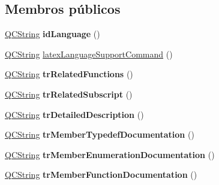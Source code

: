 \subsection*{Membros públicos}
\begin{DoxyCompactItemize}
\item 
\hypertarget{class_translator_dutch_a7de89df4aaf34700ff3db1d056a4f267}{\hyperlink{class_q_c_string}{Q\-C\-String} {\bfseries id\-Language} ()}\label{class_translator_dutch_a7de89df4aaf34700ff3db1d056a4f267}

\item 
\hyperlink{class_q_c_string}{Q\-C\-String} \hyperlink{class_translator_dutch_a0348bf1d3055ce6a48cf5f68f6fce2c1}{latex\-Language\-Support\-Command} ()
\item 
\hypertarget{class_translator_dutch_a577fc586e534023ef1529208518a994e}{\hyperlink{class_q_c_string}{Q\-C\-String} {\bfseries tr\-Related\-Functions} ()}\label{class_translator_dutch_a577fc586e534023ef1529208518a994e}

\item 
\hypertarget{class_translator_dutch_ab75e972b3134554de11b07bd64127b78}{\hyperlink{class_q_c_string}{Q\-C\-String} {\bfseries tr\-Related\-Subscript} ()}\label{class_translator_dutch_ab75e972b3134554de11b07bd64127b78}

\item 
\hypertarget{class_translator_dutch_abbd0ae4fd49dd1e88f99e03dd19d4e35}{\hyperlink{class_q_c_string}{Q\-C\-String} {\bfseries tr\-Detailed\-Description} ()}\label{class_translator_dutch_abbd0ae4fd49dd1e88f99e03dd19d4e35}

\item 
\hypertarget{class_translator_dutch_a95ba3c5f2554643a7dc0f3408c2b493d}{\hyperlink{class_q_c_string}{Q\-C\-String} {\bfseries tr\-Member\-Typedef\-Documentation} ()}\label{class_translator_dutch_a95ba3c5f2554643a7dc0f3408c2b493d}

\item 
\hypertarget{class_translator_dutch_acfa422f286e43d1d5c893475aca1e757}{\hyperlink{class_q_c_string}{Q\-C\-String} {\bfseries tr\-Member\-Enumeration\-Documentation} ()}\label{class_translator_dutch_acfa422f286e43d1d5c893475aca1e757}

\item 
\hypertarget{class_translator_dutch_aea34608536223538051d2155ff75e05e}{\hyperlink{class_q_c_string}{Q\-C\-String} {\bfseries tr\-Member\-Function\-Documentation} ()}\label{class_translator_dutch_aea34608536223538051d2155ff75e05e}


\end{DoxyCompactItemize}
